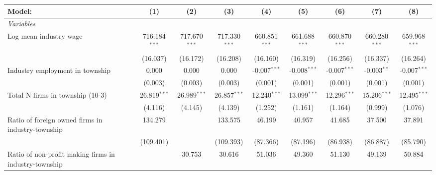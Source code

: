 \begingroup
\centering
\begin{tabular}{lcccccccc}
   \tabularnewline \midrule \midrule
   Model:                                                & (1)             & (2)             & (3)             & (4)              & (5)              & (6)              & (7)              & (8)\\  
   \midrule
   \emph{Variables}\\
   Log mean industry wage                                & 716.184$^{***}$ & 717.670$^{***}$ & 717.330$^{***}$ & 660.851$^{***}$  & 661.688$^{***}$  & 660.870$^{***}$  & 660.280$^{***}$  & 659.968$^{***}$\\   
                                                         & (16.037)        & (16.172)        & (16.208)        & (16.160)         & (16.319)         & (16.256)         & (16.337)         & (16.264)\\   
   Industry employment in township                       & 0.000           & 0.000           & 0.000           & -0.007$^{***}$   & -0.008$^{***}$   & -0.007$^{***}$   & -0.003$^{**}$    & -0.007$^{***}$\\   
                                                         & (0.003)         & (0.003)         & (0.003)         & (0.001)          & (0.001)          & (0.001)          & (0.001)          & (0.001)\\   
   Total N firms in township (10-3)                      & 26.819$^{***}$  & 26.989$^{***}$  & 26.857$^{***}$  & 12.240$^{***}$   & 13.099$^{***}$   & 12.296$^{***}$   & 15.206$^{***}$   & 12.495$^{***}$\\   
                                                         & (4.116)         & (4.145)         & (4.139)         & (1.252)          & (1.161)          & (1.164)          & (0.999)          & (1.076)\\   
   Ratio of foreign owned firms in industry-township     & 134.279         &                 & 133.575         & 46.199           & 40.957           & 41.685           & 37.500           & 37.891\\   
                                                         & (109.401)       &                 & (109.393)       & (87.366)         & (87.196)         & (86.938)         & (86.887)         & (85.790)\\   
   Ratio of non-profit making firms in industry-township &                 & 30.753          & 30.616          & 51.036           & 49.360           & 51.130           & 49.139           & 50.884\\   

\end{tabular}
